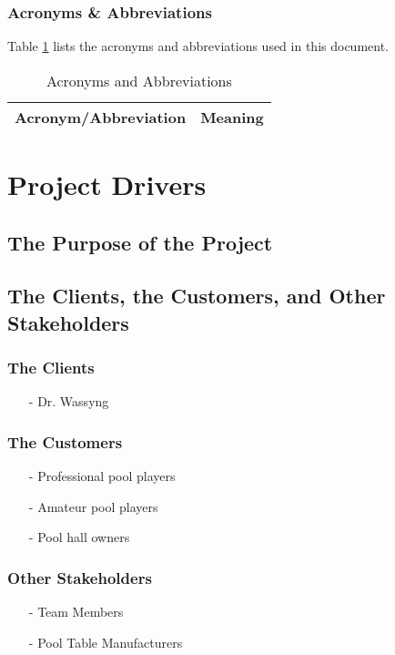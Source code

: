 \documentclass[titlepage]{article}
\begin{document}
\subsubsection{Acronyms \& Abbreviations}
Table \ref{tab:Acronyms} lists the acronyms and abbreviations used in this document.
\begin{table}[h!]
\centering
\caption{Acronyms and Abbreviations}
    \begin{tabular}{| p{6cm} | p{6cm} |}\hline
    \textbf{Acronym/Abbreviation} &\textbf{Meaning}\\\hline
    \end{tabular}
\label{tab:Acronyms}
\end{table}


\section{Project Drivers}
\subsection{The Purpose of the Project}

\subsection{The Clients, the Customers, and Other Stakeholders}
\subsubsection{The Clients}
\begin{itemize}
	\item[-] Dr. Wassyng
\end{itemize}

\subsubsection{The Customers}
\begin{itemize}
	\item[-] Professional pool players
	\item[-] Amateur pool players
	\item[-] Pool hall owners
\end{itemize}

\subsubsection{Other Stakeholders}
\begin{itemize}
	\item[-] Team Members
	\item[-] Pool Table Manufacturers
\end{itemize}
\end{document}
